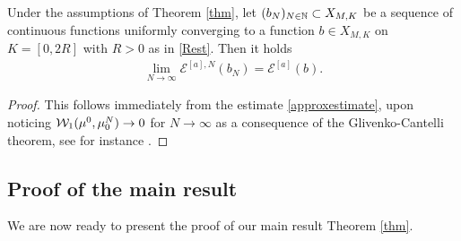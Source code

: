 \begin{lemma}\label{lemma-semicontinuous-1}
	Under the assumptions of Theorem \ref{thm}, let $(b_N)_{N \in \mathbb{N}}\subset X_{M,K}$ be a sequence of continuous functions
	uniformly converging to a function $b \in X_{M,K}$ on $K=[0,2R]$  with $R>0$ as in \eqref{Rest}.
	Then it holds
	\begin{align*}
		\lim_{N\rightarrow\infty} \mathcal E^{[a],N}(b_{N})= \mathcal E^{[a]}(b).
	\end{align*}
\end{lemma}

\begin{proof}
	This follows immediately from the estimate \eqref{approxestimate}, upon noticing
	$\mathcal{W}_1(\mu^0,\mu^N_0) \rightarrow 0$ for $N \rightarrow \infty$ as a consequence of the Glivenko-Cantelli theorem,
see for instance \cite[Lemma 3.3]{fornahuetter}.
\end{proof}

\subsection{Proof of the main result}

We are now ready to present the proof of our main result Theorem \ref{thm}.


